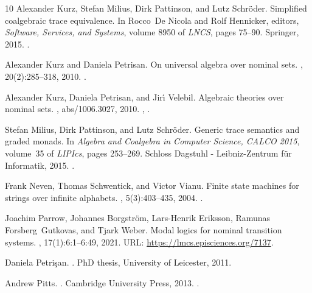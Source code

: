 \documentclass[11pt,a4paper]{amsart}
\theoremstyle{plain}
\numberwithin{equation}{section}
\newcommand{\+}[1]{\mathcal{#1}\xspace}
\theoremstyle{definition}
\begin{document}
\begin{thebibliography}{10}
Alexander Kurz, Stefan Milius, Dirk Pattinson, and Lutz Schr{\"{o}}der.
\newblock Simplified coalgebraic trace equivalence.
\newblock In Rocco~De Nicola and Rolf Hennicker, editors, {\em Software,
  Services, and Systems}, volume 8950 of {\em LNCS}, pages 75--90. Springer,
  2015.
\newblock \href {https://doi.org/10.1007/978-3-319-15545-6\_8}
  {}.

Alexander Kurz and Daniela Petrisan.
\newblock On universal algebra over nominal sets.
, 20(2):285--318, 2010.
\newblock \href {https://doi.org/10.1017/S0960129509990399}
  {}.

Alexander Kurz, Daniela Petrisan, and Jir{\'{\i}} Velebil.
\newblock Algebraic theories over nominal sets.
, abs/1006.3027, 2010.
\newblock \href {https://arxiv.org/abs/1006.3027} {},
  \href {https://doi.org/10.48550/arXiv.1006.3027}
  {}.

Stefan Milius, Dirk Pattinson, and Lutz Schr{\"{o}}der.
\newblock Generic trace semantics and graded monads.
\newblock In {\em Algebra and Coalgebra in Computer Science, {CALCO} 2015},
  volume~35 of {\em LIPIcs}, pages 253--269. Schloss Dagstuhl - Leibniz-Zentrum
  f{\"{u}}r Informatik, 2015.
\newblock \href {https://doi.org/10.4230/LIPIcs.CALCO.2015.253}
  {}.

Frank Neven, Thomas Schwentick, and Victor Vianu.
\newblock Finite state machines for strings over infinite alphabets.
, 5(3):403--435, 2004.
\newblock \href {https://doi.org/10.1145/1013560.1013562}
  {}.

Joachim Parrow, Johannes Borgström, Lars-Henrik Eriksson, Ramunas
  Forsberg~Gutkovas, and Tjark Weber.
\newblock Modal logics for nominal transition systems.
, 17(1):6:1--6:49, 2021.
\newblock URL: \url{https://lmcs.episciences.org/7137}.

Daniela Petri\c{s}an.
.
\newblock PhD thesis, University of Leicester, 2011.

Andrew Pitts.
.
\newblock Cambridge University Press, 2013.
\newblock \href {https://doi.org/10.1017/CBO9781139084673}
  {}.


\end{thebibliography}
\end{document}
